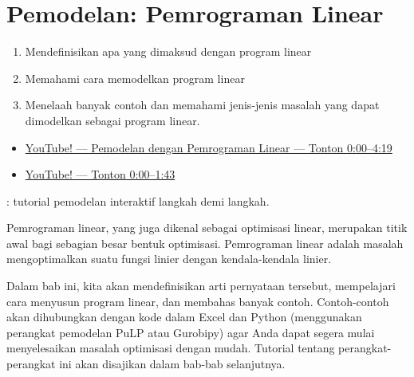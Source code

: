 
\chapter{Pemodelan: Pemrograman Linear}

\begin{outcome}
\begin{enumerate}
\item Mendefinisikan apa yang dimaksud dengan program linear
\item Memahami cara memodelkan program linear
\item Menelaah banyak contoh dan memahami jenis-jenis masalah yang dapat dimodelkan sebagai program linear.
\end{enumerate}
\end{outcome}
\begin{resource}
\begin{itemize}
\item \href{https://www.youtube.com/watch?v=K7TL5NMlKIk&ab_channel=Dr.TreforBazett}{YouTube! --- Pemodelan dengan Pemrograman Linear --- Tonton 0:00--4:19}
\item \href{https://www.youtube.com/watch?v=E72DWgKP_1Y&t=1014s&ab_channel=TomS}{YouTube! --- Tonton 0:00--1:43}
\end{itemize}
\end{resource}

\begin{tryit}
: tutorial pemodelan interaktif langkah demi langkah.
\end{tryit}


Pemrograman linear, yang juga dikenal sebagai optimisasi linear, merupakan titik awal bagi sebagian besar bentuk optimisasi. Pemrograman linear adalah masalah mengoptimalkan suatu fungsi linier dengan kendala-kendala linier.

Dalam bab ini, kita akan mendefinisikan arti pernyataan tersebut, mempelajari cara menyusun program linear, dan membahas banyak contoh. Contoh-contoh akan dihubungkan dengan kode dalam Excel dan Python (menggunakan perangkat pemodelan PuLP atau Gurobipy) agar Anda dapat segera mulai menyelesaikan masalah optimisasi dengan mudah. Tutorial tentang perangkat-perangkat ini akan disajikan dalam bab-bab selanjutnya.

